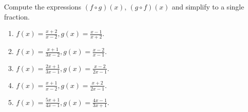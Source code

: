 \begin{problem}Compute the expressions $(f\circ g)(x)$, $(g\circ f)(x)$ and simplify to a single fraction. 

\begin{enumerate}
\item $f{}({{x}})=\frac{x+2}{x-2},
g{}({{x}})=\frac{x-1}{x+2}$.
\item 
$f{}({{x}})=\frac{x+1}{3x-2},
g{}({{x}})=\frac{x-2}{x-1}
$.

\item 
$f{}({{x}})=\frac{2x+1}{3x-1},
g{}({{x}})=\frac{x-2}{2x-1}
$.

\item 
$f{}({{x}})=\frac{x+1}{x-2},
g{}({{x}})=\frac{x+2}{2x-1}
$.

\item 
$f{}({{x}})=\frac{5x+1}{4x-1},
g{}({{x}})=\frac{4x-1}{3x+1}
$.


\end{enumerate}
\end{problem}
